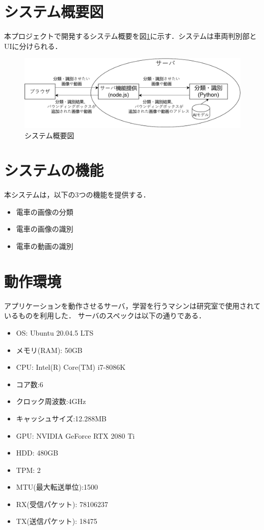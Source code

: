 \section{システム概要図}
本プロジェクトで開発するシステム概要を図\ref{FIG}に示す．システムは車両判別部とUIに分けられる．

\begin{figure}
	\centering
	\includegraphics [width=\linewidth]{chap2/fig/sys_gaiyou6.pdf}
	\caption{システム概要図}
	\label{FIG}
\end{figure}

\section{システムの機能}
本システムは，以下の3つの機能を提供する．
\begin{itemize}
	\item 電車の画像の分類
	\item 電車の画像の識別
	\item 電車の動画の識別
\end{itemize}





\section{動作環境}
アプリケーションを動作させるサーバ，学習を行うマシンは研究室で使用されているものを利用した．
サーバのスペックは以下の通りである．
\begin{itemize} 
	\item OS: Ubuntu 20.04.5 LTS 
	\item メモリ(RAM): 50GB 
	\item CPU: Intel(R) Core(TM) i7-8086K 
	\item コア数:6
	\item クロック周波数:4GHz
	\item キャッシュサイズ:12.288MB
	\item GPU: NVIDIA GeForce RTX 2080 Ti 
	\item HDD: 480GB 
	\item TPM: 2
	\item MTU(最大転送単位):1500
	\item RX(受信パケット): 78106237
	\item TX(送信パケット): 18475
\end{itemize}

